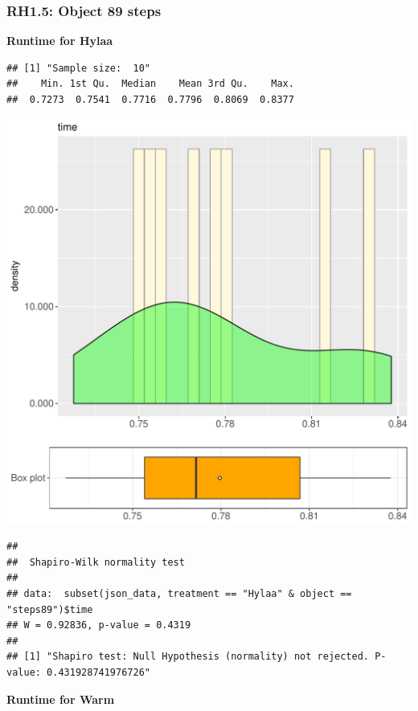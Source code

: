 \documentclass{article}\usepackage[]{graphicx}\usepackage[]{color}
\makeatletter
\def\maxwidth{ %
  \ifdim\Gin@nat@width>\linewidth
    \linewidth
  \else
    \Gin@nat@width
  \fi
}
\newenvironment{kframe}{%
 \def\at@end@of@kframe{}%
 \ifinner\ifhmode%
  \def\at@end@of@kframe{\end{minipage}}%
  \begin{minipage}{\columnwidth}%
 \fi\fi%
 \def\FrameCommand##1{\hskip\@totalleftmargin \hskip-\fboxsep
 \colorbox{shadecolor}{##1}\hskip-\fboxsep
     \hskip-\linewidth \hskip-\@totalleftmargin \hskip\columnwidth}%
 \MakeFramed {\advance\hsize-\width
   \@totalleftmargin\z@ \linewidth\hsize
   \@setminipage}}%
 {\par\unskip\endMakeFramed%
 \at@end@of@kframe}
\newenvironment{knitrout}{}{} %
\makeatother
\begin{document}
\subsubsection{RH1.5: Object 89 steps}

 \textbf{Runtime for Hylaa}
\begin{knitrout}
\color{fgcolor}\begin{kframe}
\begin{verbatim}
## [1] "Sample size:  10"
##    Min. 1st Qu.  Median    Mean 3rd Qu.    Max. 
##  0.7273  0.7541  0.7716  0.7796  0.8069  0.8377
\end{verbatim}
\end{kframe}
\includegraphics[width=\maxwidth]{figure/RH1_Hylaa_steps89-1} 
\begin{kframe}\begin{verbatim}
## 
## 	Shapiro-Wilk normality test
## 
## data:  subset(json_data, treatment == "Hylaa" & object == "steps89")$time
## W = 0.92836, p-value = 0.4319
## 
## [1] "Shapiro test: Null Hypothesis (normality) not rejected. P-value: 0.431928741976726"
\end{verbatim}
\end{kframe}
\end{knitrout}
 \textbf{Runtime for Warm}
\end{document}
